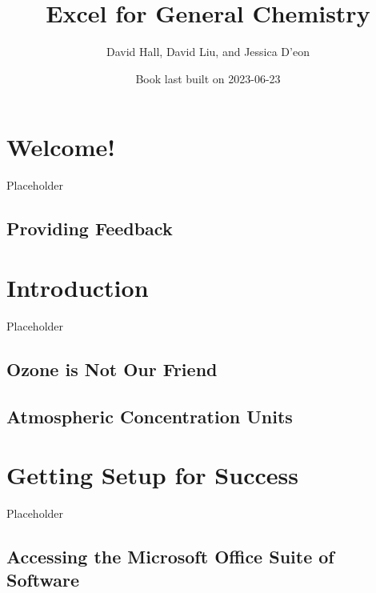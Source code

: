 \documentclass[
]{book}
\title{Excel for General Chemistry}
\author{David Hall, David Liu, and Jessica D'eon}
\date{Book last built on 2023-06-23}
\begin{document}
\maketitle

{
\setcounter{tocdepth}{1}
\tableofcontents
}
\hypertarget{welcome}{%
\chapter*{Welcome!}\label{welcome}}

Placeholder

\hypertarget{providing-feedback}{%
\section*{Providing Feedback}\label{providing-feedback}}

\hypertarget{intro}{%
\chapter{Introduction}\label{intro}}

Placeholder

\hypertarget{ozone-is-not-our-friend}{%
\section{Ozone is Not Our Friend}\label{ozone-is-not-our-friend}}

\hypertarget{atmospheric-concentration-units}{%
\section{Atmospheric Concentration Units}\label{atmospheric-concentration-units}}

\hypertarget{capabilities}{%
\chapter{Getting Setup for Success}\label{capabilities}}

Placeholder

\hypertarget{accessing-the-microsoft-office-suite-of-software}{%
\section{Accessing the Microsoft Office Suite of Software}\label{accessing-the-microsoft-office-suite-of-software}}
\end{document}
